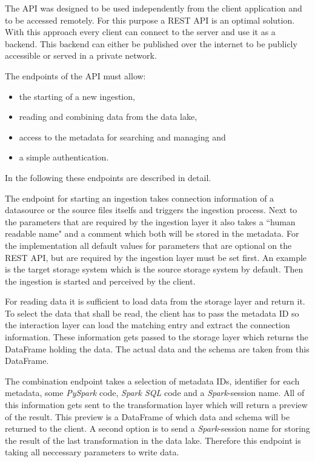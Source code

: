 \documentclass[conference]{IEEEtran}
\begin{document}
The API was designed to be used independently from the client application and to be accessed
remotely.
For this purpose a REST API is an optimal solution. 
With this approach every client can connect to the server and use it as a backend. 
This backend can either be published over the internet to be publicly accessible or served in a 
private network.

The endpoints of the API must allow:
\begin{itemize}
    \item the starting of a new ingestion,
    \item reading and combining data from the data lake,
    \item access to the metadata for searching and managing and
    \item a simple authentication.
\end{itemize}
In the following these endpoints are described in detail.

The endpoint for starting an ingestion takes connection information of a datasource or the source
files itselfs and triggers the ingestion process. 
Next to the parameters that are required by the ingestion layer it also takes a ``human readable name" 
and a comment which both will be stored in the metadata.
For the implementation all default values for parameters that are optional on the 
REST API, but are required by the ingestion layer must be set first.
An example is the target storage system which is the source storage system by default. 
Then the ingestion is started and perceived by the client.

For reading data it is sufficient to load data from the storage layer and return it. 
To select the data that shall be read, the client has to pass the metadata ID so the interaction
layer can load the matching entry and extract the connection information. 
These information gets passed to the storage layer which returns the DataFrame holding the data.
The actual data and the schema are taken from this DataFrame.

The combination endpoint takes a selection of metadata IDs, identifier for each metadata, some 
\textit{PySpark} code, \textit{Spark SQL} code and a \textit{Spark}-session name. 
All of this information gets sent to the transformation layer which will return a preview of 
the result. 
This preview is a DataFrame of which data and schema will be returned to the client. 
A second option is to send a \textit{Spark}-session name for storing the result of the last 
transformation in the data lake. 
Therefore this endpoint is taking all neccessary parameters to write data.
\end{document}
